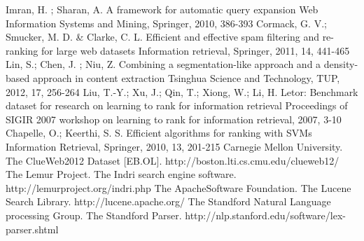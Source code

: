\documentclass[runningheads,a4paper]{llncs}
\begin{document}
\begin{thebibliography}{4}
Imran, H. ; Sharan, A. A framework for automatic query expansion Web Information Systems and Mining, Springer, 2010, 386-393
Cormack, G. V.; Smucker, M. D. \& Clarke, C. L. Efficient and effective spam filtering and re-ranking for large web datasets Information retrieval, Springer, 2011, 14, 441-465
Lin, S.; Chen, J. ; Niu, Z. Combining a segmentation-like approach and a density-based approach in content extraction Tsinghua Science and Technology, TUP, 2012, 17, 256-264
Liu, T.-Y.; Xu, J.; Qin, T.; Xiong, W.; Li, H. Letor: Benchmark dataset for research on learning to rank for information retrieval Proceedings of SIGIR 2007 workshop on learning to rank for information retrieval, 2007, 3-10
Chapelle, O.; Keerthi, S. S. Efficient algorithms for ranking with SVMs Information Retrieval, Springer, 2010, 13, 201-215
 Carnegie Mellon University. The ClueWeb2012 Dataset [EB.OL]. http://boston.lti.cs.cmu.edu/clueweb12/
 The Lemur Project. The Indri search engine software. http://lemurproject.org/indri.php
 The ApacheSoftware Foundation. The Lucene Search Library. http://lucene.apache.org/
 The Standford Natural Language processing Group. The Standford Parser. http://nlp.stanford.edu/software/lex-parser.shtml
\end{thebibliography}
\end{document}
